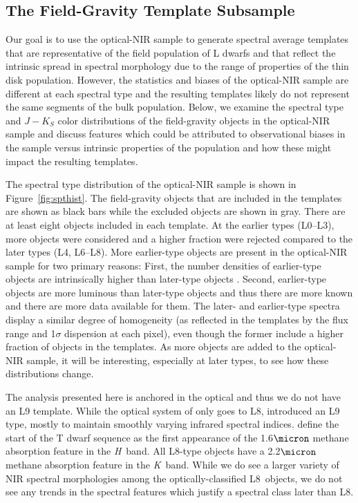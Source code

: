 \documentclass[modern,trackchanges]{aastex61}
\begin{document}
\subsection{The Field-Gravity Template Subsample}
\label{sec:templates_normal}

Our goal is to use the optical-NIR sample to generate spectral average templates that are representative of the field population of L dwarfs and that reflect the intrinsic spread in spectral morphology due to the range of properties of the thin disk population.
However, the statistics and biases of the optical-NIR sample are different at each spectral type and the resulting templates likely do not represent the same segments of the bulk population.
Below, we examine the spectral type and $J-K_S$ color distributions of the field-gravity objects in the optical-NIR sample and discuss features which could be attributed to observational biases in the sample versus intrinsic properties of the population and how these might impact the resulting templates.

The spectral type distribution of the optical-NIR sample is shown in Figure~\ref{fig:spthist}.
The field-gravity objects that are included in the templates are shown as black bars while the excluded objects are shown in gray.
There are at least eight objects included in each template.
At the earlier types (L0--L3), more objects were considered and a higher fraction were rejected compared to the later types (L4, L6--L8).
More earlier-type objects are present in the optical-NIR sample for two primary reasons: First, the number densities of earlier-type objects are intrinsically higher than later-type objects \citep{Cruz03,Reid08,DayJones:2013hm}.
Second, earlier-type objects are more luminous than later-type objects and thus there are more known and there are more data available for them.
The later- and earlier-type spectra display a similar degree of homogeneity (as reflected in the templates by the flux range and 1$\sigma$ dispersion at each pixel), even though the former include a higher fraction of objects in the templates.
As more objects are added to the optical-NIR sample, it will be interesting, especially at later types, to see how these distributions change.

The analysis presented here is anchored in the optical and thus we do not have an L9 template.
While the optical system of \cite{K99} only goes to L8, \cite{Geballe02} introduced an L9 type, mostly to maintain smoothly varying infrared spectral indices.
\cite{Geballe02} define the start of the T dwarf sequence as the first appearance of the 1.6$\micron$ methane absorption feature in the \emph{H}~band.
All L8-type objects have a 2.2$\micron$ methane absorption feature in the \emph{K}~band.
While we do see a larger variety of NIR spectral morphologies among the optically-classified L8~objects, we do not see any trends in the spectral features which justify a spectral class later than L8.
\end{document}
